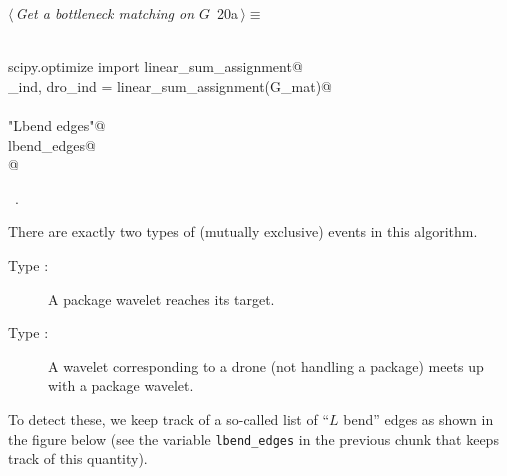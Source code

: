 \documentclass[10pt, english, oneside]{report}
\begin{document}
\begin{flushleft} \small
\begin{minipage}{\linewidth}\label{scrap17}\raggedright\small
{} $\langle\,${\itshape Get a bottleneck matching on $G$}\nobreak\ {\footnotesize {20a}}$\,\rangle\equiv$
\vspace{-1ex}
\begin{list}{}{} \item
\mbox{}\verb@@\\
\mbox{}\verb@from scipy.optimize import linear_sum_assignment@\\
\mbox{}\verb@pkg_ind, dro_ind = linear_sum_assignment(G_mat)@\\
\mbox{}\verb@@\\
\mbox{}\verb@print "Lbend edges"@\\
\mbox{}\verb@print lbend_edges@\\
\mbox{}\verb@return @\\
\mbox{}\verb@@{\NWsep}
\end{list}
\vspace{-1.5ex}
\footnotesize
\begin{list}{}{\setlength{\itemsep}{-\parsep}\setlength{\itemindent}{-\leftmargin}}
\item \NWtxtMacroRefIn\ .

\item{}
\end{list}
\end{minipage}\vspace{4ex}
\end{flushleft}

There are exactly two types of (mutually exclusive) events in this algorithm. 

\begin{description}
\item[Type :] A package wavelet reaches its target. 
\item[Type :] A wavelet corresponding to a drone (not handling a package) 
                      meets up with a package wavelet.
\end{description}

To detect these, we keep track of a so-called list of ``$L$ bend'' edges as shown in the figure below 
(see the variable \verb|lbend_edges| in the previous chunk that keeps track of this quantity).  
\end{document}
